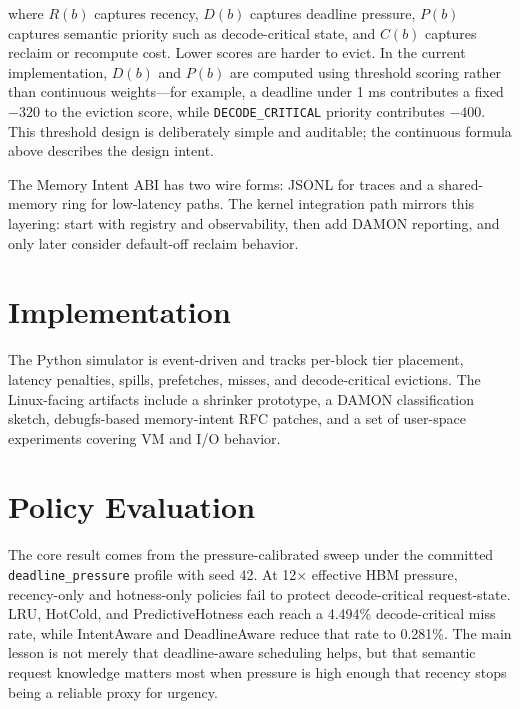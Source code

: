 \documentclass[10pt,twocolumn]{article}
\begin{document}
where $R(b)$ captures recency, $D(b)$ captures deadline pressure, $P(b)$ captures semantic priority such as decode-critical state, and $C(b)$ captures reclaim or recompute cost. Lower scores are harder to evict. In the current implementation, $D(b)$ and $P(b)$ are computed using threshold scoring rather than continuous weights---for example, a deadline under 1 ms contributes a fixed $-320$ to the eviction score, while \texttt{DECODE\_CRITICAL} priority contributes $-400$. This threshold design is deliberately simple and auditable; the continuous formula above describes the design intent.

The Memory Intent ABI has two wire forms: JSONL for traces and a shared-memory ring for low-latency paths. The kernel integration path mirrors this layering: start with registry and observability, then add DAMON reporting, and only later consider default-off reclaim behavior.

\section{Implementation}
\label{sec:impl}

The Python simulator is event-driven and tracks per-block tier placement, latency penalties, spills, prefetches, misses, and decode-critical evictions. The Linux-facing artifacts include a shrinker prototype, a DAMON classification sketch, debugfs-based memory-intent RFC patches, and a set of user-space experiments covering VM and I/O behavior.

\section{Policy Evaluation}
\label{sec:eval}

The core result comes from the pressure-calibrated sweep under the committed \texttt{deadline\_pressure} profile with seed 42. At 12$\times$ effective HBM pressure, recency-only and hotness-only policies fail to protect decode-critical request-state. LRU, HotCold, and PredictiveHotness each reach a 4.494\% decode-critical miss rate, while IntentAware and DeadlineAware reduce that rate to 0.281\%. The main lesson is not merely that deadline-aware scheduling helps, but that semantic request knowledge matters most when pressure is high enough that recency stops being a reliable proxy for urgency.
\end{document}
